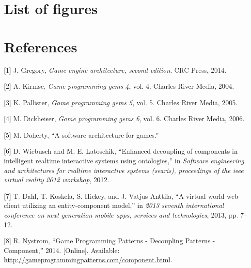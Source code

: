 \documentclass[twoside, 12pt, a4paper, openright]{book}
\begin{document}
\chapter*{List of figures}\label{list-of-figures}

\makeatletter
\renewcommand\listoffigures{%
} \makeatother

\listoffigures

\footnotesize
\clearpage
\pagestyle{plain} \fancyhf{} \lhead{} \chead{} \rhead{} \lfoot{}
\cfoot{} \rfoot{}

\chapter*{References}\label{references}

\hypertarget{refs}{}
\hypertarget{ref-gregory2014game}{}
{[}1{]} J. Gregory, \emph{Game engine architecture, second edition}. CRC
Press, 2014.

\hypertarget{ref-game_programming_gems_4}{}
{[}2{]} A. Kirmse, \emph{Game programming gems 4}, vol. 4. Charles River
Media, 2004.

\hypertarget{ref-game_programming_gems_5}{}
{[}3{]} K. Pallister, \emph{Game programming gems 5}, vol. 5. Charles
River Media, 2005.

\hypertarget{ref-game_programming_gems_6}{}
{[}4{]} M. Dickheiser, \emph{Game programming gems 6}, vol. 6. Charles
River Media, 2006.

\hypertarget{ref-doherty2003software}{}
{[}5{]} M. Doherty, ``A software architecture for games.''

\hypertarget{ref-Wiebusch:2012}{}
{[}6{]} D. Wiebusch and M. E. Latoschik, ``Enhanced decoupling of
components in intelligent realtime interactive systems using
ontologies,'' in \emph{Software engineering and architectures for
realtime interactive systems (searis), proceedings of the ieee virtual
reality 2012 workshop}, 2012.

\hypertarget{ref-6658092}{}
{[}7{]} T. Dahl, T. Koskela, S. Hickey, and J. Vatjus-Anttila, ``A
virtual world web client utilizing an entity-component model,'' in
\emph{2013 seventh international conference on next generation mobile
apps, services and technologies}, 2013, pp. 7--12.

\hypertarget{ref-robertnystorm_gpp_component}{}
{[}8{]} R. Nystrom, ``Game Programming Patterns - Decoupling Patterns -
Component,'' 2014. {[}Online{]}. Available:
\url{http://gameprogrammingpatterns.com/component.html}.
\end{document}

